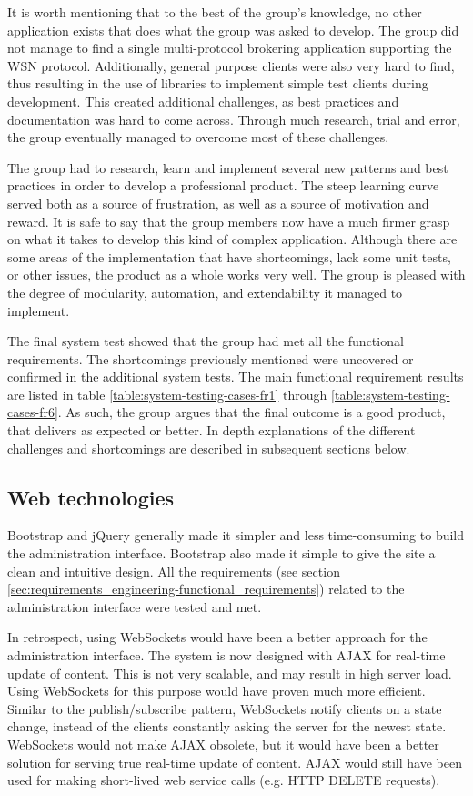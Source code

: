 It is worth mentioning that to the best of the group's knowledge, no other application exists that does what the group was asked to develop. The group did not manage to find a single multi-protocol brokering application supporting the WSN protocol. Additionally, general purpose clients were also very hard to find, thus resulting in the use of libraries to implement simple test clients during development. This created additional challenges, as best practices and documentation was hard to come across. Through much research, trial and error, the group eventually managed to overcome most of these challenges.

The group had to research, learn and implement several new patterns and best practices in order to develop a professional product. The steep learning curve served both as a source of frustration, as well as a source of motivation and reward. It is safe to say that the group members now have a much firmer grasp on what it takes to develop this kind of complex application. Although there are some areas of the implementation that have shortcomings, lack some unit tests, or other issues, the product as a whole works very well. The group is pleased with the degree of modularity, automation, and extendability it managed to implement.

The final system test showed that the group had met all the functional requirements. The shortcomings previously mentioned were uncovered or confirmed in the additional system tests. The main functional requirement results are listed in table \ref{table:system-testing-cases-fr1} through \ref{table:system-testing-cases-fr6}. As such, the group argues that the final outcome is a good product, that delivers as expected or better.
In depth explanations of the different challenges and shortcomings are described in subsequent sections below.

\subsection{Web technologies}
\label{subsec:Web_technologies}

Bootstrap and jQuery generally made it simpler and less time-consuming to build the administration interface. Bootstrap also made it simple to give the site a clean and intuitive design. All the requirements (see section \ref{sec:requirements_engineering-functional_requirements}) related to the administration interface were tested and met.

In retrospect, using WebSockets \cite{web-sockets} would have been a better approach for the administration interface. The system is now designed with AJAX for real-time update of content. This is not very scalable, and may result in high server load. Using WebSockets for this purpose would have proven much more efficient. Similar to the publish/subscribe pattern, WebSockets notify clients on a state change, instead of the clients constantly asking the server for the newest state. WebSockets would not make AJAX obsolete, but it would have been a better solution for serving true real-time update of content. AJAX would still have been used for making short-lived web service calls (e.g. HTTP DELETE requests).

